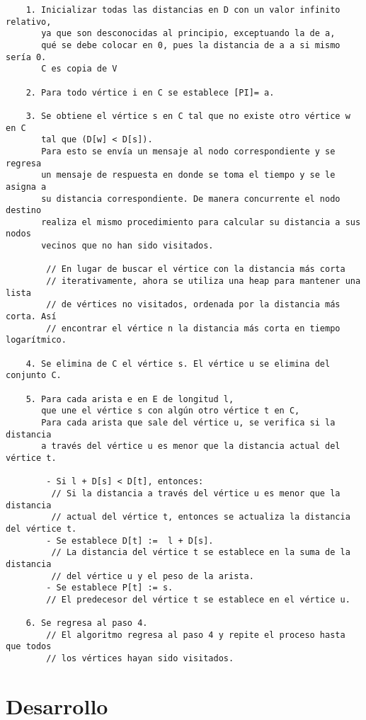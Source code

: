 \documentclass[a4paper,12pt]{article}
\begin{document}
\begin{verbatim}
    1. Inicializar todas las distancias en D con un valor infinito relativo, 
       ya que son desconocidas al principio, exceptuando la de a, 
       qué se debe colocar en 0, pues la distancia de a a si mismo sería 0. 
       C es copia de V        
    
    2. Para todo vértice i en C se establece [PI]= a.        
    
    3. Se obtiene el vértice s en C tal que no existe otro vértice w en C 
       tal que (D[w] < D[s]). 
       Para esto se envía un mensaje al nodo correspondiente y se regresa
       un mensaje de respuesta en donde se toma el tiempo y se le asigna a 
       su distancia correspondiente. De manera concurrente el nodo destino 
       realiza el mismo procedimiento para calcular su distancia a sus nodos
       vecinos que no han sido visitados.
    
        // En lugar de buscar el vértice con la distancia más corta 
        // iterativamente, ahora se utiliza una heap para mantener una lista 
        // de vértices no visitados, ordenada por la distancia más corta. Así 
        // encontrar el vértice n la distancia más corta en tiempo logarítmico.    
    
    4. Se elimina de C el vértice s. El vértice u se elimina del conjunto C.
    
    5. Para cada arista e en E de longitud l, 
       que une el vértice s con algún otro vértice t en C,
       Para cada arista que sale del vértice u, se verifica si la distancia 
       a través del vértice u es menor que la distancia actual del vértice t.
    
        - Si l + D[s] < D[t], entonces:
         // Si la distancia a través del vértice u es menor que la distancia 
         // actual del vértice t, entonces se actualiza la distancia del vértice t.
        - Se establece D[t] :=  l + D[s].
         // La distancia del vértice t se establece en la suma de la distancia 
         // del vértice u y el peso de la arista.
        - Se establece P[t] := s.
        // El predecesor del vértice t se establece en el vértice u.
    
    6. Se regresa al paso 4.
        // El algoritmo regresa al paso 4 y repite el proceso hasta que todos
        // los vértices hayan sido visitados.    
\end{verbatim}
    

\section*{Desarrollo}
\end{document}
